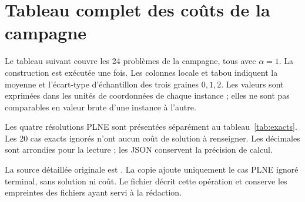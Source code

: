 \chapter{Tableau complet des coûts de la campagne}
Le tableau suivant couvre les 24 problèmes de la campagne, tous avec
$\alpha=1$. La construction est exécutée une fois. Les colonnes locale
et tabou indiquent la moyenne et l'écart-type d'échantillon des trois graines
$0,1,2$. Les valeurs sont exprimées dans les unités de coordonnées de
chaque instance ; elles ne sont pas comparables en valeur brute d'une
instance à l'autre.

Les quatre résolutions PLNE sont présentées séparément au
tableau~\ref{tab:exacts}. Les 20 cas exacts ignorés n'ont aucun coût de
solution à renseigner. Les décimales sont arrondies pour la lecture ;
les JSON conservent la précision de calcul.

\begin{table}[htbp]\centering
{\fontsize{9}{12}\selectfont\setlength{\tabcolsep}{4pt}
}
\caption{Coûts moyens de construction, recherche locale et recherche tabou,
sur tous les cas de la campagne de démonstration.}
\sourcetable
\end{table}
\FloatBarrier

La source détaillée originale est .
La copie  ajoute uniquement le cas
PLNE ignoré terminal, sans solution ni coût. Le fichier
 décrit cette opération et conserve
les empreintes des fichiers ayant servi à la rédaction.
